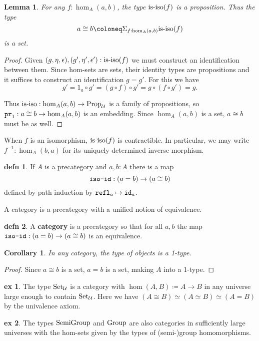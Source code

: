 \documentclass{amsart}
\theoremstyle{theorem}
\newtheorem*{lem}{Lemma}
\newtheorem*{cor}{Corollary}
\theoremstyle{definition}
\newtheorem*{defn}{defn}
\newtheorem*{ex}{ex}
\theoremstyle{remark}
\newcommand{\0}{\mathbbe{0}}
\newcommand{\1}{\mathbbe{1}}
\newcommand{\2}{\mathbbe{2}}
\newcommand{\3}{\mathbbe{3}}
\newcommand{\4}{\mathbbe{4}}
\newcommand{\term}[1]{{\textup{\texttt{#1}}}}
\newcommand{\type}[1]{{\textup{#1}}}
\newcommand{\id}{\term{id}}
\newcommand{\pr}{\term{pr}}
\newcommand{\refl}{\term{refl}}
\newcommand{\UU}{{\mathcal{U}}}
\newcommand{\is}[1]{\type{is-{#1}}}
\newcommand{\Prop}{\type{Prop}_{\UU}}
\newcommand{\Set}{\type{Set}_{\UU}}
\begin{document}
\begin{lem} For any $f : \hom_A(a,b)$, the type $\is{iso}(f)$ is a proposition. Thus the type
\[ a \cong b \coloneq \Sigma_{f: \hom_A(a,b)} \is{iso}(f)\] 
is a set.
\end{lem}
\begin{proof}
Given $(g,\eta,\epsilon), (g', \eta',\epsilon') : \is{iso}(f)$ we must construct an identification between them. Since hom-sets are sets, their identity types are propositions and it suffices to construct an identification $g = g'$. For this we have
\[ g' = 1_a \circ g' = (g \circ f) \circ g' = g \circ (f \circ g') = g.\]

Thus $\is{iso} : \hom_A(a,b) \to \Prop$ is a family of propositions, so $\pr_1 : a \cong b \to \hom_A(a,b)$ is an embedding. Since $\hom_A(a,b)$ is a set, $a \cong b$ must be as well.
\end{proof}

When $f$ is an isomorphism, $\is{iso}(f)$ is contractible. In particular, we may write $f^{-1} : \hom_A(b,a)$ for its uniquely determined inverse morphism.

\begin{defn} If $A$ is a precategory and $a,b :A$ there is a map
\[ \term{iso-id} : (a=b) \to (a \cong b)\] defined by path induction by $\refl_a \mapsto \id_a$.
\end{defn}

A category is a precategory with a unified notion of equivalence.

\begin{defn} A \textbf{category} is a precategory so that for all $a,b$ the map $\term{iso-id} : (a=b) \to (a \cong b)$ is an equivalence.
\end{defn}

\begin{cor} In any category, the type of objects is a 1-type.
\end{cor}
\begin{proof}
Since $a \cong b$ is a set, $a=b$ is a set, making $A$ into a 1-type.
\end{proof}

\begin{ex} The type $\Set$ is a category with $\hom(A,B) \coloneq A \to B$ in any universe large enough to contain $\Set$. Here we have $(A \cong B) \simeq (A \simeq B) \simeq (A = B)$ by the univalence axiom.
\end{ex}

\begin{ex} The types $\type{SemiGroup}$ and $\type{Group}$ are also categories in sufficiently large universes with the hom-sets given by the types of (semi-)group homomorphisms.
\end{ex}
\end{document}
